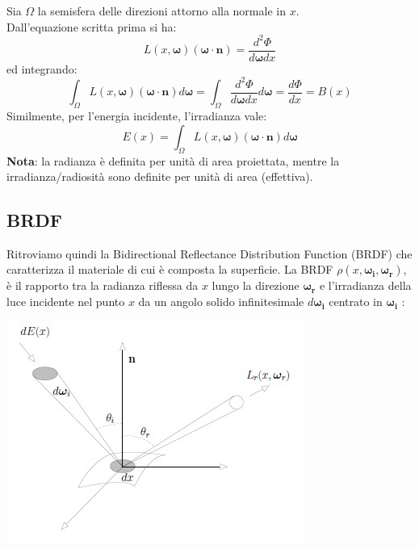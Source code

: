 \documentclass[a4paper, 10pt]{article}
\renewcommand{\vec}{\bm}
\begin{document}
			Sia $ \Omega $ la semisfera delle direzioni attorno alla normale in $ x $.\\
			Dall'equazione scritta prima si ha:
			\[
				L(x, \vec{\omega})(\vec{\omega}\cdot \vec{n}) = \dfrac{d^2\Phi}{d\vec{\omega}dx} 
			\]
			ed integrando:
			\[
				\int_{\Omega} L(x, \vec{\omega})(\vec{\omega}\cdot \vec{n})d\vec{\omega} =
				\int_{\Omega} \dfrac{d^2\Phi}{d\vec{\omega}dx} d\vec{\omega} =
				\dfrac{d\Phi}{dx} = B(x)
			\]
			Similmente, per l’energia incidente, l’irradianza vale:
			\[
				E(x) = \int_{\Omega} L(x, \vec{\omega})(\vec{\omega}\cdot \vec{n})d\vec{\omega}
			\]
			\textbf{Nota}: la radianza è definita per unità di area proiettata, mentre la
			irradianza/radiosità sono definite per unità di area (effettiva).
			
	\subsection{BRDF}
		Ritroviamo quindi la Bidirectional Reflectance Distribution
		Function (BRDF) che caratterizza il materiale di cui è composta la
		superficie.
		La BRDF $ \rho(x, \vec{\omega_i}, \vec{\omega_r}) $, è il rapporto tra la radianza riflessa da $ x $
		lungo la direzione $ \vec{\omega_r} $ e l'irradianza della luce incidente nel
		punto $ x $ da un angolo solido infinitesimale $ d\vec{\omega_i} $ centrato in $ \vec{\omega_i} $ :
		
		\begin{center}
			\includegraphics[scale=0.5]{brdf}
		\end{center}
		
\end{document}
